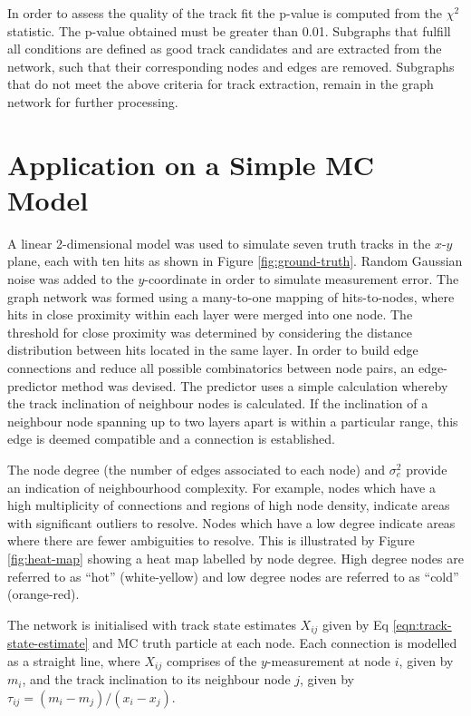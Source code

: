 In order to assess the quality of the track fit the p-value is computed from the $\chi^2$ statistic. The p-value obtained must be greater than 0.01. Subgraphs that fulfill all conditions are defined as good track candidates and are extracted from the network, such that their corresponding nodes and edges are removed. Subgraphs that do not meet the above criteria for track extraction, remain in the graph network for further processing.





\section{Application on a Simple MC Model}
\label{gnn-application-toy-model}

A linear 2-dimensional model was used to simulate seven truth tracks in the $x$-$y$ plane, each with ten hits as shown in Figure \ref{fig:ground-truth}. Random Gaussian noise was added to the $y$-coordinate in order to simulate measurement error. The graph network was formed using a many-to-one mapping of hits-to-nodes, where hits in close proximity within each layer were merged into one node. The threshold for close proximity was determined by considering the distance distribution between hits located in the same layer. In order to build edge connections and reduce all possible combinatorics between node pairs, an edge-predictor method was devised. The predictor uses a simple calculation whereby the track inclination of neighbour nodes is calculated. If the inclination of a neighbour node spanning up to two layers apart is within a particular range, this edge is deemed compatible and a connection is established. 

The node degree (the number of edges associated to each node) and $\sigma_e^2$ provide an indication of neighbourhood complexity. For example, nodes which have a high multiplicity of connections and regions of high node density, indicate areas with significant outliers to resolve. Nodes which have a low degree indicate areas where there are fewer ambiguities to resolve. This is illustrated by Figure \ref{fig:heat-map} showing a heat map labelled by node degree. High degree nodes are referred to as ``hot'' (white-yellow) and low degree nodes are referred to as ``cold'' (orange-red).

The network is initialised with track state estimates $X_{ij}$ given by Eq \eqref{eqn:track-state-estimate} and MC truth particle at each node. Each connection is modelled as a straight line, where $X_{ij}$ comprises of the $y$-measurement at node $i$, given by $m_i$, and the track inclination to its neighbour node $j$, given by $\tau_{ij} = (m_i - m_j) / (x_i - x_j)$. 

